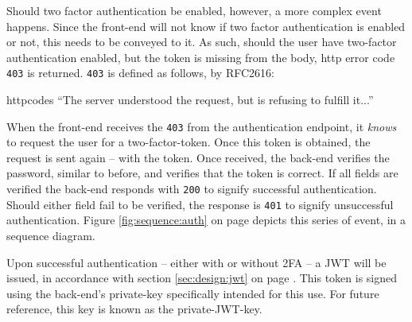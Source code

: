 		Should two factor authentication be enabled, however, a more complex event happens. Since the front-end will not know if two factor authentication is enabled or not, this needs to be conveyed to it. As such, should the user have two-factor authentication enabled, but the token is missing from the body, http error code \verb=403= is returned. \verb=403= is defined as follows, by RFC2616\cite{httpcodes}:
		\begin{citequote}[sec.10.4.4]{httpcodes}
				``The server understood the request, but is refusing to fulfill it...''
		\end{citequote}
		When the front-end receives the \verb=403= from the authentication endpoint, it \emph{knows} to request the user for a two-factor-token. Once this token is obtained, the request is sent again -- with the token. Once received, the back-end verifies the password, similar to before, and verifies that the token is correct. If all fields are verified the back-end responds with \verb=200= to signify successful authentication. Should either field fail to be verified, the response is \verb=401= to signify unsuccessful authentication. Figure \ref{fig:sequence:auth} on page \pageref{fig:sequence:auth} depicts this series of event, in a sequence diagram.

		Upon successful authentication -- either with or without 2FA -- a JWT will be issued, in accordance with section \ref{sec:design:jwt} on page \pageref{sec:design:jwt}. This token is signed using the back-end's private-key specifically intended for this use. For future reference, this key is known as the private-JWT-key.


